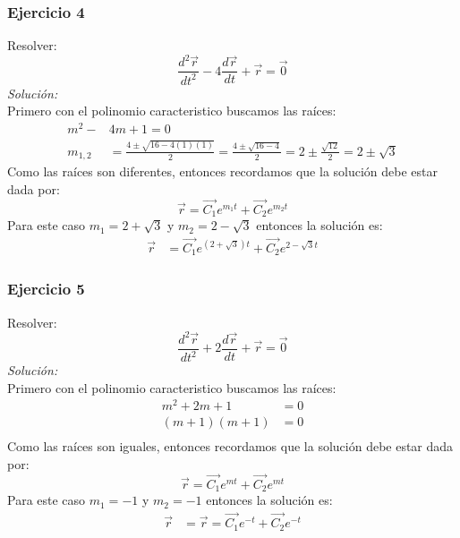 \documentclass[12pt,openany]{book}
\begin{document}
			\subsubsection{Ejercicio 4}
				Resolver:
				$$
					\frac{d^{2}\vec{r}}{dt^{2}}-4\frac{d\vec{r}}{dt}+ \vec{r}=\vec{0}
				$$
				\noindent\textsl{Soluci\'on:}\\
				Primero con el polinomio caracteristico buscamos las ra\'ices:
				\begin{equation*}
					\begin{split}
						m^{2}-&4m+1=0	\\
						m_{1,2}&=\frac{4 \pm \sqrt{16-4(1)(1)}}{2}					
							   =\frac{4 \pm \sqrt{16-4}}{2}							
							   =2\pm\frac{\sqrt{12}}{2}								
							   =2\pm\sqrt{3}
					\end{split}
				\end{equation*}
				Como las ra\'ices son diferentes, entonces recordamos que la soluci\'on debe estar dada por:
				$$	
				\vec{r}=\vec{C_{1}}e^{m_{1}t}+\vec{C_{2}}e^{m_{2}t}				
				$$
				Para este caso $m_{1}=2+\sqrt{3}$ y $m_{2}=2-\sqrt{3}$ entonces la soluci\'on es:
				\begin{equation*}
					\begin{split}
						\vec{r}&=\vec{C_{1}}e^{(2+\sqrt{3})t}+\vec{C_{2}}e^{2-\sqrt{3}t}			
					\end{split}
				\end{equation*}

			\subsubsection{Ejercicio 5}
				Resolver:
				$$
					\frac{d^{2}\vec{r}}{dt^{2}}+2\frac{d\vec{r}}{dt}+\vec{r}=\vec{0}
				$$
				\noindent\textsl{Soluci\'on:}\\
				Primero con el polinomio caracteristico buscamos las ra\'ices:
				\begin{equation*}
					\begin{split}
						m^{2}+2m+1&=0	\\
						(m+1)(m+1)&=0	\\
					\end{split}
				\end{equation*}
				Como las ra\'ices son iguales, entonces recordamos que la soluci\'on debe estar dada por:
				$$	
				\vec{r}=\vec{C_{1}}e^{mt}+\vec{C_{2}}e^{mt}			
				$$
				Para este caso $m_{1}=-1$ y $m_{2}=-1$ entonces la soluci\'on es:
				\begin{equation*}
					\begin{split}
						\vec{r}&=\vec{r}=\vec{C_{1}}e^{-t}+\vec{C_{2}}e^{-t}		
					\end{split}
				\end{equation*}
\end{document}

